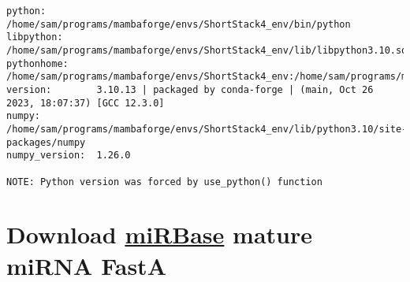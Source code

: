 \documentclass[
]{article}
\newenvironment{Shaded}{\begin{snugshade}}{\end{snugshade}}
\newcommand{\AttributeTok}[1]{\textcolor[rgb]{0.77,0.63,0.00}{#1}}
\newcommand{\BuiltInTok}[1]{#1}
\newcommand{\CommentTok}[1]{\textcolor[rgb]{0.56,0.35,0.01}{\textit{#1}}}
\newcommand{\DataTypeTok}[1]{\textcolor[rgb]{0.13,0.29,0.53}{#1}}
\newcommand{\FunctionTok}[1]{\textcolor[rgb]{0.00,0.00,0.00}{#1}}
\newcommand{\NormalTok}[1]{#1}
\newcommand{\StringTok}[1]{\textcolor[rgb]{0.31,0.60,0.02}{#1}}
\newcommand{\VariableTok}[1]{\textcolor[rgb]{0.00,0.00,0.00}{#1}}
\begin{document}
\begin{verbatim}
python:         /home/sam/programs/mambaforge/envs/ShortStack4_env/bin/python
libpython:      /home/sam/programs/mambaforge/envs/ShortStack4_env/lib/libpython3.10.so
pythonhome:     /home/sam/programs/mambaforge/envs/ShortStack4_env:/home/sam/programs/mambaforge/envs/ShortStack4_env
version:        3.10.13 | packaged by conda-forge | (main, Oct 26 2023, 18:07:37) [GCC 12.3.0]
numpy:          /home/sam/programs/mambaforge/envs/ShortStack4_env/lib/python3.10/site-packages/numpy
numpy_version:  1.26.0

NOTE: Python version was forced by use_python() function
\end{verbatim}

\hypertarget{download-mirbase-mature-mirna-fasta}{%
\section{\texorpdfstring{Download \href{https://mirbase.org/}{miRBase} mature miRNA FastA}{Download miRBase mature miRNA FastA}}\label{download-mirbase-mature-mirna-fasta}}

\begin{Shaded}
\end{Shaded}
\end{document}
